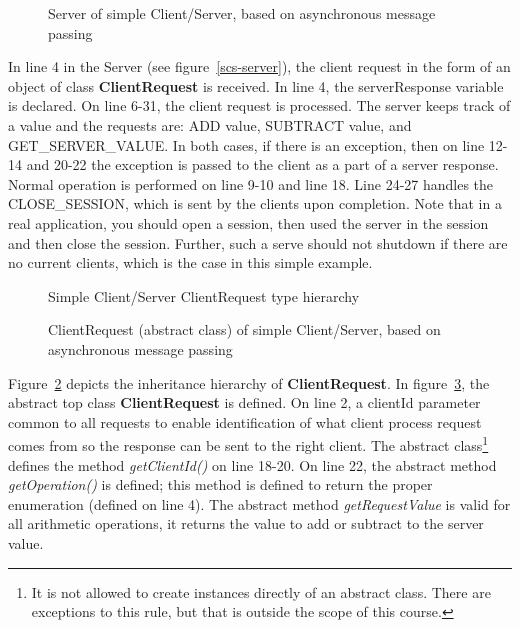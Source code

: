 \documentclass[11pt]{article} %
\begin{document}
\begin{figure}[ht]

\caption{Server of simple Client/Server, based on asynchronous message passing}
\label{fig:scs-server}
\end{figure}

In line 4 in the Server (see figure~\ref{scs-server}), the client request in the form of an object of class {\bfseries ClientRequest} is received. In line 4, the serverResponse variable is declared. On line 6-31, the client request is processed. The server keeps track of a value and the requests are: ADD value, SUBTRACT value, and GET\_SERVER\_VALUE. In both cases, if there is an exception, then on line 12-14 and 20-22 the exception is passed to the client as a part of a server response. Normal operation is performed on line 9-10 and line 18. Line 24-27 handles the CLOSE\_SESSION, which is sent by the clients upon completion. Note that in a real application, you should open a session, then used the server in the session and then close the session. Further, such a serve should not shutdown if there are no current clients, which is the case in this simple example. 

\begin{figure}[ht]
\caption{Simple Client/Server ClientRequest type hierarchy}
\label{fig:scs-cri}
\end{figure}


\begin{figure}[ht]

\caption{ClientRequest (abstract class) of simple Client/Server, based on asynchronous message passing}
\label{fig:scs-clientRequest}
\end{figure}

Figure~\ref{fig:scs-cri} depicts the inheritance hierarchy of {\bfseries ClientRequest}. In figure~\ref{fig:scs-clientRequest}, the abstract top class {\bfseries ClientRequest} is defined. On line 2, a clientId parameter common to all requests to enable identification of what client process request comes from so the response can be sent to the right client. The abstract class\footnote{It is not allowed to create instances directly of an abstract class. There are exceptions to this rule, but that is outside the scope of this course.} defines the method \emph{getClientId()} on line 18-20. On line 22, the abstract method \emph{getOperation()} is defined; this method is defined to return the proper enumeration (defined on line 4). The abstract method \emph{getRequestValue} is valid for all arithmetic operations, it returns the value to add or subtract to the server value. 
\end{document}
